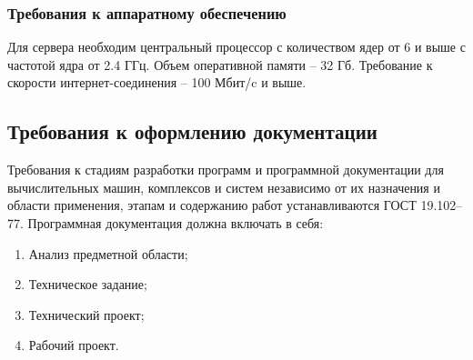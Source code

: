 \subsubsection{Требования к аппаратному обеспечению}
Для сервера необходим центральный процессор с количеством ядер от 6 и выше с частотой ядра от 2.4 ГГц. Объем оперативной памяти – 32 Гб. Требование к скорости интернет-соединения – 100 Мбит/c и выше.

\subsection{Требования к оформлению документации}
Требования к стадиям разработки программ и программной документации для вычислительных машин, комплексов и систем независимо от их назначения и области применения, этапам и содержанию работ устанавливаются ГОСТ 19.102–77.
Программная документация должна включать в себя:

\begin{enumerate}
\item Анализ предметной области;
\item Техническое задание;
\item Технический проект;
\item Рабочий проект.
\end{enumerate}
